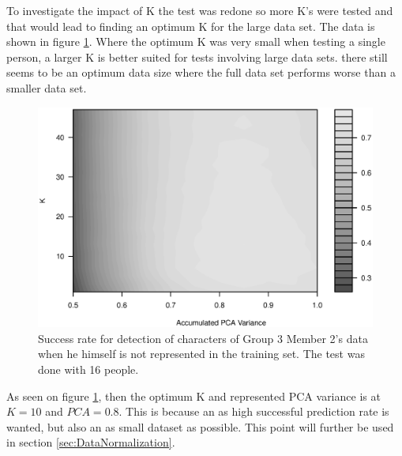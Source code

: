 To investigate the impact of K the test was redone so more K's were tested and that would lead to finding an optimum K for the large data set.
The data is shown in figure \ref{fig:k_v_PCA}. 
Where the optimum K was very small when testing a single person, a larger K is better suited for tests involving large data sets.
there still seems to be an optimum data size where the full data set performs worse than a smaller data set. 

\begin{figure}[H]
\centering
\includegraphics[width = \textwidth]{graphics/contour_k_PCA_oneVsRest}
\caption[Detailed PCA performance]{Success rate for detection of characters of Group 3 Member 2's data when he himself is not represented in the training set. 
The test was done with 16 people.}
\label{fig:k_v_PCA}
\end{figure}

As seen on figure \ref{fig:k_v_PCA}, then the optimum K and represented PCA variance is at $K = 10$ and $PCA = 0.8$. 
This is because an as high successful prediction rate is wanted, but also an as small dataset as possible. 
This point will further be used in section \ref{sec:DataNormalization}.

